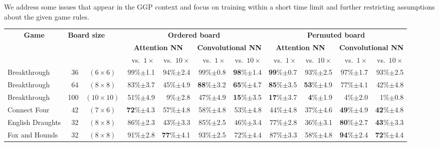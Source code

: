 \documentclass[letterpaper]{article} %
\begin{document}
We address some issues that appear in the GGP context and focus on training within a short time limit and further restricting assumptions about the given game rules.


\begin{table*}[!ht]\small\renewcommand{\arraystretch}{1.045}
\newcommand{\cb}[1]{{\scriptsize $\pm$#1}}
\newcommand{\oppA}{vs.\ $1\times$}
\newcommand{\oppB}{vs.\ $10\times$}
\begin{center}\begin{tabular}{|lrc|r|r|r|r|r|r|r|r|}\hline
\multicolumn{1}{|c}{\multirow{3}{*}{{\bf Game}}} & \multicolumn{2}{l|}{\multirow{3}{*}{\bf Board size}} & \multicolumn{4}{c|}{\bf Ordered board} & \multicolumn{4}{c|}{\bf Permuted board} \\\cline{4-11}
& & & \multicolumn{2}{c|}{{\bf Attention NN}} & \multicolumn{2}{c|}{{\bf Convolutional NN}} & \multicolumn{2}{c|}{{\bf Attention NN}} & \multicolumn{2}{c|}{{\bf Convolutional NN}} \\%
\multicolumn{3}{|c|}{} & \oppA & \oppB & \oppA & \oppB & \oppA & \oppB & \oppA & \oppB \\\hline

Breakthrough & 36 & $(6\times6)$  & {99}\%\cb{1.1} & 94\%\cb{2.4} & {99}\%\cb{0.8} & \textbf{98}\%\cb{1.4} & \textbf{99}\%\cb{0.7} & {93}\%\cb{2.5}  & 97\%\cb{1.7} & {93}\%\cb{2.5} \\ %
Breakthrough & 64 & $ (8\times8)$ & 83\%\cb{3.7} & 45\%\cb{4.9} & \textbf{88}\%\cb{3.2} & \textbf{65}\%\cb{4.7} & \textbf{85}\%\cb{3.5} & \textbf{53}\%\cb{4.9} & 77\%\cb{4.1} & 42\%\cb{4.8} \\ %
Breakthrough & 100 & $(10\times10)$ & {51}\%\cb{4.9} & 9\%\cb{2.8} & {47}\%\cb{4.9} & \textbf{15}\%\cb{3.5} & \textbf{17}\%\cb{3.7} & \textbf{4}\%\cb{1.9} & 4\%\cb{2.0} & 1\%\cb{0.8} \\

\multirow{1}{*}{Connect Four} & 42 & $(7\times6)$  & \textbf{72}\%\cb{4.3} & {57}\%\cb{4.8} & 58\%\cb{4.8} & {53}\%\cb{4.8} & 44\%\cb{4.8} & 37\%\cb{4.6}  & \textbf{49}\%\cb{4.9} & \textbf{42}\%\cb{4.8} \\

\multirow{1}{*}{English Draughts} & 32 & $(8\times8)$  & {86}\%\cb{2.3} & {43}\%\cb{3.3} & {85}\%\cb{2.5} & {46}\%\cb{3.4} & 77\%\cb{2.8} & 36\%\cb{3.1}  & \textbf{80}\%\cb{2.7} & \textbf{43}\%\cb{3.3} \\

\multirow{1}{*}{Fox and Hounds} & 32 & $(8\times8)$  & {91}\%\cb{2.8} & \textbf{77}\%\cb{4.1} & {93}\%\cb{2.5} & 72\%\cb{4.4} & 87\%\cb{3.3} & 58\%\cb{4.8}  & \textbf{94}\%\cb{2.4} & \textbf{72}\%\cb{4.4} \\


\end{tabular}
\end{center}
\end{table*}
\end{document}
